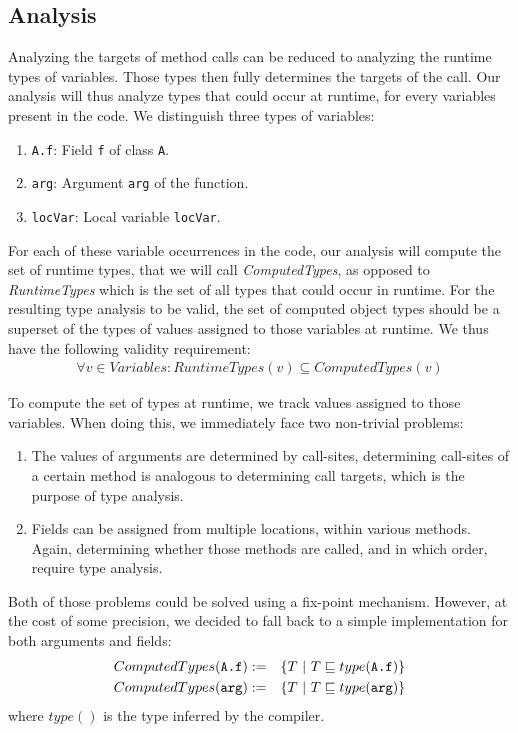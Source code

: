 \subsection{Analysis}
Analyzing the targets of method calls can be reduced to analyzing the runtime
types of variables. Those types then fully determines the targets of the call.
Our analysis will thus analyze types that could occur at runtime, for every
variables present in the code. We distinguish three types of variables:
\begin{enumerate}
    \item \verb/A.f/: Field \verb/f/ of class \verb/A/.
    \item \verb/arg/: Argument \verb/arg/ of the function.
    \item \verb/locVar/: Local variable \verb/locVar/.
\end{enumerate}

For each of these variable occurrences in the code, our analysis will compute
the set of runtime types, that we will call \emph{ComputedTypes}, as opposed to
\emph{RuntimeTypes} which is the set of all types that could occur in runtime.
For the resulting type analysis to be valid, the set of computed object types
should be a superset of the types of values assigned to those variables at
runtime.  We thus have the following validity requirement:
\begin{eqnarray*}
    \forall v \in Variables: RuntimeTypes(v) \subseteq ComputedTypes(v)
\end{eqnarray*}

To compute the set of types at runtime, we track values assigned to those
variables. When doing this, we immediately face two non-trivial problems:
\begin{enumerate}
    \item The values of arguments are determined by call-sites, determining
    call-sites of a certain method is analogous to determining call targets,
    which is the purpose of type analysis.

    \item Fields can be assigned from multiple locations, within various
    methods. Again, determining whether those methods are
    called, and in which order, require type analysis.
\end{enumerate}

Both of those problems could be solved using a fix-point mechanism. However, at
the cost of some precision, we decided to fall back to a simple implementation
for both arguments and fields:
\begin{eqnarray*}
    ComputedTypes(\verb/A.f/) &:=& \{ T ~|~ T \subtypeeq type(\verb/A.f/) \} \\
    ComputedTypes(\verb/arg/) &:=& \{ T ~|~ T \subtypeeq type(\verb/arg/) \} \\
\end{eqnarray*}
where $type()$ is the type inferred by the compiler.

